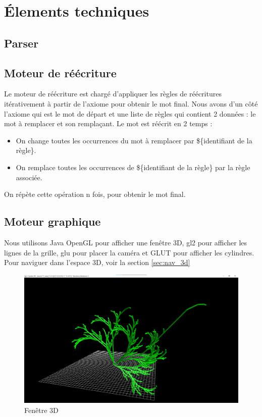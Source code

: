 \chapter{Élements techniques}

\section{Parser}\label{sec:parser}

\section{Moteur de réécriture}

Le moteur de réécriture est chargé d'appliquer les règles de réécritures itérativement à partir de l'axiome pour obtenir le mot final.
Nous avons d'un côté l'axiome qui est le mot de départ et une liste de règles qui contient 2 données : le mot à remplacer et son remplaçant.
Le mot est réécrit en 2 temps :\\
\begin{itemize}
    \item On change toutes les occurrences du mot à remplacer par \$\{identifiant de la règle\}.
    \item On remplace toutes les occurrences de \$\{identifiant de la règle\} par la règle associée.
\end{itemize}
On répète cette opération n fois, pour obtenir le mot final.

\section{Moteur graphique}\label{src:interface3d}

Nous utilisons Java OpenGL pour afficher une fenêtre 3D, gl2 pour afficher les lignes de la grille, glu pour placer la caméra et GLUT pour afficher les cylindres.
Pour naviguer dans l'espace 3D, voir la section \ref{sec:nav_3d}

\begin{figure}[h!]
    \centering
    \includegraphics[width=0.8\linewidth]{pics/3dGUI.png}
    \caption{Fenêtre 3D}
    \label{fig:3d_frame}
\end{figure}

